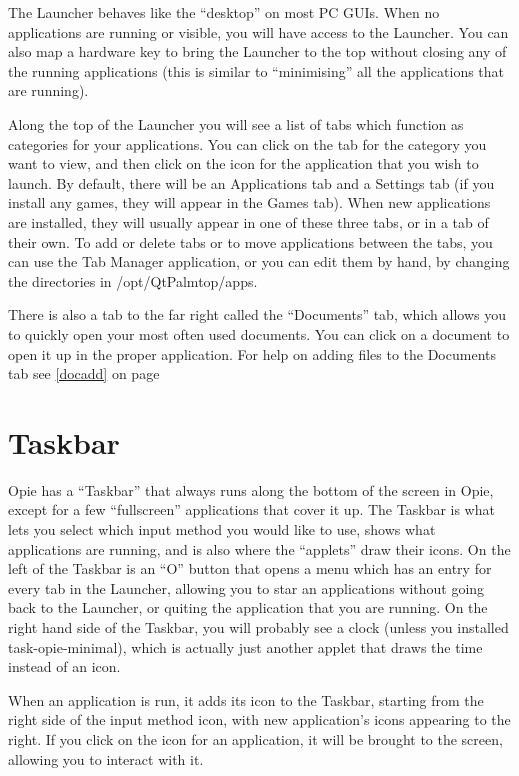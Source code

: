 \documentclass[12pt,letterpaper,oneside, openany]{book} \usepackage[latin1] {inputenc}
\begin{document}
The Launcher behaves like the ``desktop'' on most PC GUIs.  When no applications are running or visible, you will have access to the Launcher.  You can also map a hardware key to bring the Launcher to the top without closing any of the running applications (this is similar to ``minimising'' all the applications that are running).

Along the top of the Launcher you will see a list of tabs which function as categories for your applications.  You can click on the tab for the category you want to view, and then click on the icon for the application that you wish to launch.  By default, there will be an Applications tab and a Settings tab (if you install any games, they will appear in the Games tab).  When new applications are installed, they will usually appear in one of these three tabs, or in a tab of their own.  To add or delete tabs or to move applications between the tabs, you can use the Tab Manager application, or you can edit them by hand, by changing the directories in /opt/QtPalmtop/apps.

There is also a tab to the far right called the ``Documents'' tab, which allows you to quickly open your most often used documents.  You can click on a document to open it up in the proper application.  For help on adding files to the Documents tab see \ref{docadd} on page \pageref{docadd}

\section{Taskbar}

Opie has a ``Taskbar'' that always runs along the bottom of the screen in Opie, except for a few ``fullscreen'' applications that cover it up.  The Taskbar is what lets you select which input method you would like to use, shows what applications are running, and is also where the ``applets'' draw their icons.  On the left of the Taskbar is an ``O'' button that opens a menu which has an entry for every tab in the Launcher, allowing you to star an applications without going back to the Launcher, or quiting the application that you are running.  On the right hand side of the Taskbar, you will probably see a clock (unless you installed task-opie-minimal), which is actually just another applet that draws the time instead of an icon.

When an application is run, it adds its icon to the Taskbar, starting from the right side of the input method icon, with new application's icons appearing to the right.  If you click on the icon for an application, it will be brought to the screen, allowing you to interact with it.
\end{document}
